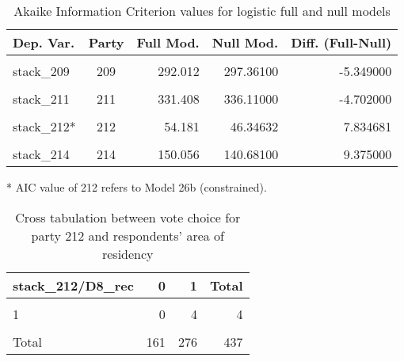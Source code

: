 \documentclass[
]{article}
\begin{document}
\begin{table}[!h]

\caption{\label{tab:unnamed-chunk-13}Akaike Information Criterion values for logistic full and null models 
        \label{table:logit_aic_be_fr}}
\centering
\begin{threeparttable}
\begin{tabular}[t]{lcrrr}
\toprule
Dep. Var. & Party & Full Mod. & Null Mod. & Diff. (Full-Null)\\
\midrule
\cellcolor{gray!6}{stack\_208} & \cellcolor{gray!6}{208} & \cellcolor{gray!6}{334.675} & \cellcolor{gray!6}{326.04300} & \cellcolor{gray!6}{8.632000}\\
stack\_209 & 209 & 292.012 & 297.36100 & -5.349000\\
\cellcolor{gray!6}{stack\_210} & \cellcolor{gray!6}{210} & \cellcolor{gray!6}{200.627} & \cellcolor{gray!6}{206.63700} & \cellcolor{gray!6}{-6.010000}\\
stack\_211 & 211 & 331.408 & 336.11000 & -4.702000\\
\cellcolor{gray!6}{stack\_212} & \cellcolor{gray!6}{212} & \cellcolor{gray!6}{51.342} & \cellcolor{gray!6}{46.34600} & \cellcolor{gray!6}{4.996000}\\
\addlinespace
stack\_212* & 212 & 54.181 & 46.34632 & 7.834681\\
\cellcolor{gray!6}{stack\_213} & \cellcolor{gray!6}{213} & \cellcolor{gray!6}{276.248} & \cellcolor{gray!6}{277.95700} & \cellcolor{gray!6}{-1.709000}\\
stack\_214 & 214 & 150.056 & 140.68100 & 9.375000\\
\bottomrule
\end{tabular}
\begin{tablenotes}[para]
\item[*] AIC value of 212 refers to Model 26b (constrained).
\end{tablenotes}
\end{threeparttable}
\end{table}

\begin{table}

\caption{\label{tab:unnamed-chunk-14}Cross tabulation between vote choice for party 212 and respondents' area of residency 
                   \label{table:crosstab_1_be}}
\centering
\begin{tabular}[t]{l|r|r|r}
\hline
stack\_212/D8\_rec & 0 & 1 & Total\\
\hline
\cellcolor{gray!6}{0} & \cellcolor{gray!6}{152} & \cellcolor{gray!6}{256} & \cellcolor{gray!6}{408}\\
\hline
1 & 0 & 4 & 4\\
\hline
\cellcolor{gray!6}{NA} & \cellcolor{gray!6}{9} & \cellcolor{gray!6}{16} & \cellcolor{gray!6}{25}\\
\hline
Total & 161 & 276 & 437\\
\hline
\end{tabular}
\end{table}
\end{document}
